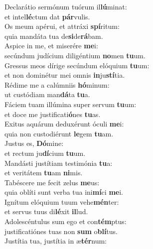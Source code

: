 \evenverse Declarátio sermónum tuórum il\textbf{lú}minat:~\*\\
\evenverse et intel\textbf{lé}ctum dat \textbf{pár}vulis.\\
\oddverse Os meum apérui, et attráxi \textbf{spí}ritum:~\*\\
\oddverse quia mandáta tua de\textbf{si}de\textbf{rá}bam.\\
\evenverse Aspice in me, et miserére \textbf{me}i:~\*\\
\evenverse secúndum judícium diligéntium \textbf{no}men \textbf{tu}um.\\
\oddverse Gressus meos dírige secúndum elóquium \textbf{tu}um:~\*\\
\oddverse et non dominétur mei omnis \textbf{in}ju\textbf{stí}tia.\\
\evenverse Rédime me a calúmniis \textbf{hó}minum:~\*\\
\evenverse ut custódiam man\textbf{dá}ta \textbf{tu}a.\\
\oddverse Fáciem tuam illúmina super servum \textbf{tu}um:~\*\\
\oddverse et doce me justificati\textbf{ó}nes \textbf{tu}as.\\
\evenverse Exitus aquárum deduxérunt óculi \textbf{me}i:~\*\\
\evenverse quia non custodiérunt \textbf{le}gem \textbf{tu}am.\\
\oddverse Justus es, \textbf{Dó}mine:~\*\\
\oddverse et rectum ju\textbf{dí}cium \textbf{tu}um.\\
\evenverse Mandásti justítiam testimónia \textbf{tu}a:~\*\\
\evenverse et veritátem \textbf{tu}am \textbf{ni}mis.\\
\oddverse Tabéscere me fecit zelus \textbf{me}us:~\*\\
\oddverse quia oblíti sunt verba tua ini\textbf{mí}ci \textbf{me}i.\\
\evenverse Ignítum elóquium tuum vehe\textbf{mén}ter:~\*\\
\evenverse et servus tuus di\textbf{lé}xit \textbf{il}lud.\\
\oddverse Adolescéntulus sum ego et con\textbf{tém}ptus:~\*\\
\oddverse justificatiónes tuas non \textbf{sum} o\textbf{blí}tus.\\
\evenverse Justítia tua, justítia in æ\textbf{tér}num:~\*\\
